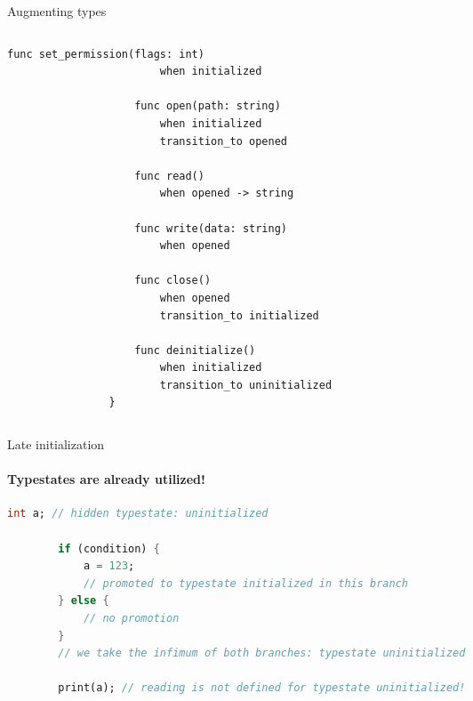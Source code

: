 \documentclass[compress,12pt,xcolor={dvipsnames}]{beamer}
\begin{document}
\begin{frame}[fragile]{Augmenting types}
\begin{columns}
\begin{column}{0.5\textwidth}
\begin{lstlisting}[language=TypeState,gobble=16,basicstyle=\tt\tiny]
                    func set_permission(flags: int)
                        when initialized
                    
                    func open(path: string)
                        when initialized
                        transition_to opened
                    
                    func read()
                        when opened -> string
                    
                    func write(data: string)
                        when opened
                    
                    func close()
                        when opened
                        transition_to initialized
                    
                    func deinitialize()
                        when initialized
                        transition_to uninitialized
                }
            \end{lstlisting}
        \end{column}
    \end{columns}
\end{frame}

\begin{frame}[fragile]{Late initialization}
    \framesubtitle{Typestates are already utilized!}
    \begin{lstlisting}[language=Dart,gobble=8,basicstyle=\tt\scriptsize]
        int a; // hidden typestate: uninitialized
        
        if (condition) {
            a = 123;
            // promoted to typestate initialized in this branch
        } else {
            // no promotion
        }
        // we take the infimum of both branches: typestate uninitialized
        
        print(a); // reading is not defined for typestate uninitialized!
    \end{lstlisting}
\end{frame}

\end{document}
